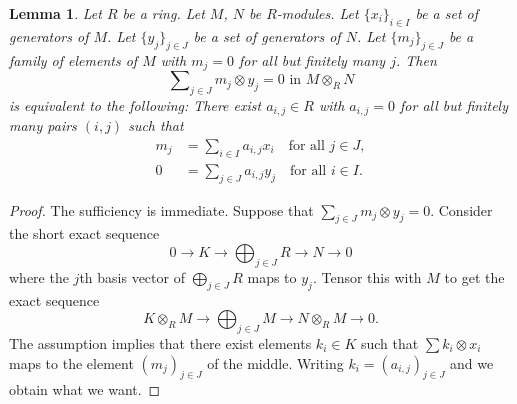 \documentclass[10pt,a4paper]{amsart}
\theoremstyle{plain}
\newtheorem{lemma}[subsection]{Lemma}
\theoremstyle{definition}
\theoremstyle{remark}
\numberwithin{equation}{subsection}
\begin{document}
\begin{lemma}
\label{lemma-relations}
Let $R$ be a ring.
Let $M$, $N$ be $R$-modules.
Let $\{x_i\}_{i \in I}$ be a set of generators of $M$.
Let $\{y_j\}_{j \in J}$ be a set of generators of $N$.
Let $\{m_j\}_{j \in J}$ be a family of elements of $M$ with $m_j = 0$
for all but finitely many $j$.
Then
$$
\sum\nolimits_{j \in J} m_j \otimes y_j = 0 \text{ in } M \otimes_R N
$$
is equivalent to the following:
There exist $a_{i, j} \in R$ with $a_{i, j} = 0$ for all but finitely many
pairs $(i, j)$ such that
\begin{align*}
m_j & = \sum\nolimits_{i \in I} a_{i, j} x_i \quad\text{for all } j \in J, \\
0 & = \sum\nolimits_{j \in J} a_{i, j} y_j \quad\text{for all } i \in I.
\end{align*}
\end{lemma}

\begin{proof}
The sufficiency is immediate. Suppose that
$\sum_{j \in J} m_j \otimes y_j = 0$.
Consider the short exact sequence
$$
0 \to K \to \bigoplus\nolimits_{j \in J} R \to N \to 0
$$
where the $j$th basis vector of $\bigoplus\nolimits_{j \in J} R$ maps
to $y_j$. Tensor this with $M$ to get the exact sequence
$$
K \otimes_R M \to \bigoplus\nolimits_{j \in J} M \to N \otimes_R M \to 0.
$$
The assumption implies that there exist elements $k_i \in K$ such that
$\sum k_i \otimes x_i$ maps to the element $(m_j)_{j \in J}$ of the middle.
Writing $k_i = (a_{i, j})_{j \in J}$ and we obtain what we want.
\end{proof}
\end{document}
